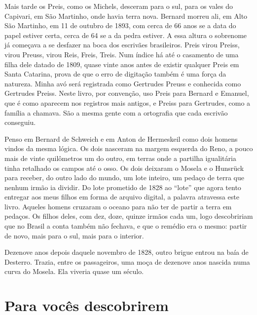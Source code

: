 \documentclass[
  brazilian,
  11pt,
  openany]{book}
\begin{document}
Mais tarde os Preis, como os Michels, desceram para o sul, para os vales
do Capivari, em São Martinho, onde havia terra nova. Bernard morreu ali,
em Alto São Martinho, em 11 de outubro de 1893, com cerca de 66 anos se
a data do papel estiver certa, cerca de 64 se a da pedra estiver. A essa
altura o sobrenome já começava a se desfazer na boca dos escrivães
brasileiros. Preis virou Preiss, virou Preuss, virou Reis, Freis, Treis.
Num índice há até o casamento de uma filha dele datado de 1809, quase
vinte anos antes de existir qualquer Preis em Santa Catarina, prova de
que o erro de digitação também é uma força da natureza. Minha avó será
registrada como Gertrudes Preuss e conhecida como Gertrudes Preiss.
Neste livro, por convenção, uso Preis para Bernard e Emanuel, que é como
aparecem nos registros mais antigos, e Preiss para Gertrudes, como a
família a chamava. São a mesma gente com a ortografia que cada escrivão
conseguiu.

Penso em Bernard de Schweich e em Anton de Hermeskeil como dois homens
vindos da mesma lógica. Os dois nasceram na margem esquerda do Reno, a
pouco mais de vinte quilômetros um do outro, em terras onde a partilha
igualitária tinha retalhado os campos até o osso. Os dois deixaram o
Mosela e o Hunsrück para receber, do outro lado do mundo, um lote
inteiro, um pedaço de terra que nenhum irmão ia dividir. Do lote
prometido de 1828 ao ``lote'' que agora tento entregar aos meus filhos
em forma de arquivo digital, a palavra atravessa este livro. Aqueles
homens cruzaram o oceano para não ter de partir a terra em pedaços. Os
filhos deles, com dez, doze, quinze irmãos cada um, logo descobririam
que no Brasil a conta também não fechava, e que o remédio era o mesmo:
partir de novo, mais para o sul, mais para o interior.

Dezenove anos depois daquele novembro de 1828, outro brigue entrou na
baía de Desterro. Trazia, entre os passageiros, uma moça de dezenove
anos nascida numa curva do Mosela. Ela viveria quase um século.

\section{Para vocês descobrirem}\label{para-vocuxeas-descobrirem-7}
\end{document}
